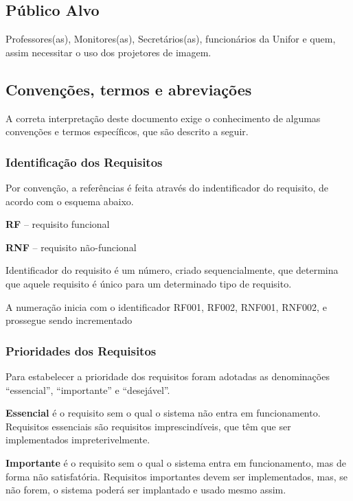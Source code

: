 \subsection{Público Alvo}

Professores(as), Monitores(as), Secretários(as), funcionários da Unifor 
e quem, assim necessitar o uso dos projetores de imagem.

\subsection{Convenções, termos e abreviações}

A correta interpretação deste documento exige o conhecimento de algumas 
convenções e termos específicos, que são descrito a seguir.


\subsubsection{Identificação dos Requisitos}

\hspace{1.0cm}

Por convenção, a referências é feita através do indentificador do requisito, 
de acordo com o esquema abaixo.

  \textbf{RF} – requisito funcional

  \textbf{RNF} – requisito não-funcional

Identificador do requisito é um número, criado sequencialmente, que
determina que aquele requisito é único para um determinado tipo de 
requisito. 

A numeração inicia com o identificador RF001, RF002, RNF001, RNF002, e prossegue 
sendo incrementado 

\subsubsection{Prioridades dos Requisitos}

Para estabelecer a prioridade dos requisitos foram adotadas as 
denominações “essencial”, “importante” e “desejável”. 

\textbf{Essencial} é o requisito sem o qual o sistema não entra em 
funcionamento. Requisitos essenciais são requisitos imprescindíveis, 
que têm que ser implementados impreterivelmente.

\textbf{Importante} é o requisito sem o qual o sistema entra em 
funcionamento, mas de forma não satisfatória. Requisitos importantes 
devem ser implementados, mas, se não forem, o sistema poderá ser 
implantado e usado mesmo assim.

